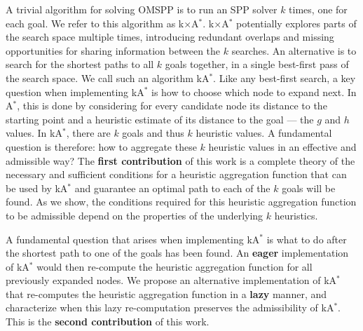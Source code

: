\documentclass[smallextended]{svjour3}       %
\newcommand{\omspp}{\ac{OMSPP}\xspace}
\newcommand{\spp}{\ac{SPP}\xspace}
\newcommand{\astar}{A$^*$\xspace}
\newcommand{\kastar}{kA$^*$\xspace}
\newcommand{\kxastar}{k$\times$A$^*$\xspace}
\begin{document}
A trivial algorithm for solving \omspp is to run an \spp solver $k$ times, one for each goal. 
We refer to this algorithm as \kxastar. \kxastar potentially explores parts of the search space multiple times, introducing redundant overlaps and missing opportunities for sharing information between the $k$ searches. An alternative is to search for the shortest paths to all $k$ goals together, in a single best-first pass of the search space. We call such an algorithm \kastar. Like any best-first search, a key question when implementing \kastar is how to choose which node to expand next. 
In \astar{}, this is done by considering for every candidate node its distance to the starting point and a heuristic estimate of its distance to the goal --- the $g$ and $h$ values. In \kastar{}, there are $k$ goals and thus $k$ heuristic values. A fundamental question is therefore: how to aggregate these $k$ heuristic values in an effective and admissible way?
 The \textbf{first contribution} of this work is a complete theory of the necessary and sufficient conditions for a heuristic aggregation function that can be used by \kastar and guarantee an optimal path to each of the $k$ goals will be found. As we show, the conditions required for this heuristic aggregation function to be admissible depend on the properties of the underlying $k$ heuristics. 


A fundamental question that arises when implementing \kastar is what to do after the shortest path to one of the goals has been found. An \textbf{eager} implementation of \kastar would then re-compute the heuristic aggregation function for all previously expanded nodes. We propose an alternative implementation of \kastar that re-computes the heuristic aggregation function in a \textbf{lazy} manner, and characterize when this lazy re-computation preserves the admissibility of \kastar. 
This is the \textbf{second contribution} of this work. 
\end{document}
